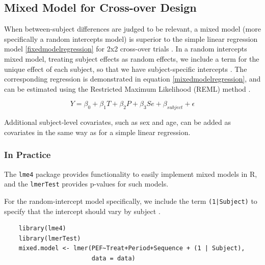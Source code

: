 \documentclass[12pt, TexShade, letterpaper]{report}
\begin{document}
\subsection{Mixed Model for Cross-over Design}\label{mixed-model-subsection}
When between-subject differences are judged to be relevant, a mixed model (more specifically a random intercepts model) is superior to the simple linear regression model \ref{fixedmodelregression} for 2x2 cross-over trials \cite{jones2003design}. In a random intercepts mixed model, treating subject effects as random effects, we include a term for the unique effect of each subject, so that we have subject-specific intercepts \cite{mixedmodelsR}. The corresponding regression is demonstrated in equation \ref{mixedmodelregression}, and can be estimated using the Restricted Maximum Likelihood (REML) method \cite{jones2003design}.

\begin{equation}
   Y = \beta_0 + \beta_1 T + \beta_2 P + \beta_3 Se + \beta_{subject} + \epsilon
   \label{mixedmodelregression}
\end{equation}

Additional subject-level covariates, such as sex and age, can be added as covariates in the same way as for a simple linear regression.

\subsubsection{In Practice}
The \texttt{lme4} package provides functionality to easily implement mixed models in R, and the \texttt{lmerTest} provides p-values for such models.

For the random-intercept model specifically, we include the term \texttt{(1|Subject)} to specify that the intercept should vary by subject \cite{mixedmodelsR}.

\begin{verbatim}
    library(lme4)
    library(lmerTest)
    mixed.model <- lmer(PEF~Treat+Period+Sequence + (1 | Subject),
                        data = data)
\end{verbatim}
\end{document}
